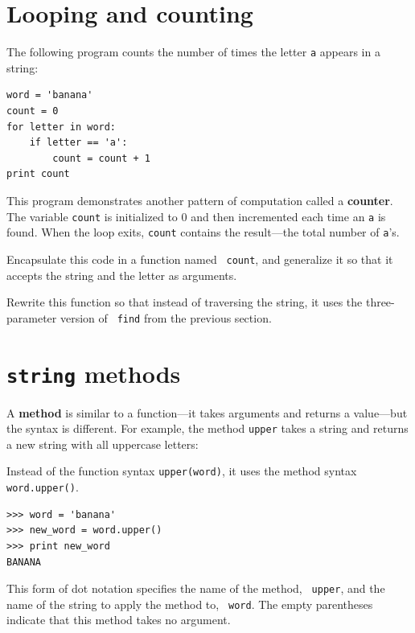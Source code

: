 \documentclass[10pt]{book}
\begin{document}
\section{Looping and counting}
\label{counter}


The following program counts the number of times the letter {\tt a}
appears in a string:

\beforeverb
\begin{verbatim}
word = 'banana'
count = 0
for letter in word:
    if letter == 'a':
        count = count + 1
print count
\end{verbatim}
\afterverb
%
This program demonstrates another pattern of computation called a {\bf
counter}.  The variable {\tt count} is initialized to 0 and then
incremented each time an {\tt a} is found.
When the loop exits, {\tt count}
contains the result---the total number of {\tt a}'s.

\begin{ex}

Encapsulate this code in a function named {\tt
count}, and generalize it so that it accepts the string and the
letter as arguments.
\end{ex}

\begin{ex}
Rewrite this function so that instead of
traversing the string, it uses the three-parameter version of {\tt
find} from the previous section.
\end{ex}


\section{{\tt string} methods}

A {\bf method} is similar to a function---it takes arguments and
returns a value---but the syntax is different.  For example, the
method {\tt upper} takes a string and returns a new string with
all uppercase letters:


Instead of the function syntax {\tt upper(word)}, it uses
the method syntax {\tt word.upper()}.


\beforeverb
\begin{verbatim}
>>> word = 'banana'
>>> new_word = word.upper()
>>> print new_word
BANANA
\end{verbatim}
\afterverb
%
This form of dot notation specifies the name of the method, {\tt
upper}, and the name of the string to apply the method to, {\tt
word}.  The empty parentheses indicate that this method takes no
argument.
\end{document}
